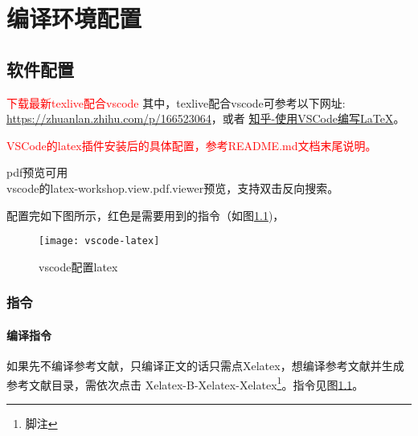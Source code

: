 \chapter{编译环境配置}

\section{软件配置}
\textcolor{red}{下载最新texlive配合vscode}
其中，texlive配合vscode可参考以下网址:\\
\url{https://zhuanlan.zhihu.com/p/166523064}，或者 \href{https://zhuanlan.zhihu.com/p/38178015}{知乎-使用VSCode编写LaTeX}。

\textcolor{red}{VSCode的latex插件安装后的具体配置，参考README.md文档末尾说明。}

pdf预览可用\\
vscode的latex-workshop.view.pdf.viewer预览，支持双击反向搜索。

配置完如下图所示，红色是需要用到的指令（如图\ref{fig_vs_latex})，
 \begin{figure}[!htb]
  \centering
  \texttt{[image: vscode-latex]}
  \caption{vscode配置latex}
  \label{fig_vs_latex}
\end{figure}

\subsection{指令}
\subsubsection{编译指令}
如果先不编译参考文献，只编译正文的话只需点Xelatex，想编译参考文献并生成参考文献目录，需依次点击 Xelatex-B-Xelatex-Xelatex\footnote{脚注}。指令见图\ref{fig_vs_latex}。

